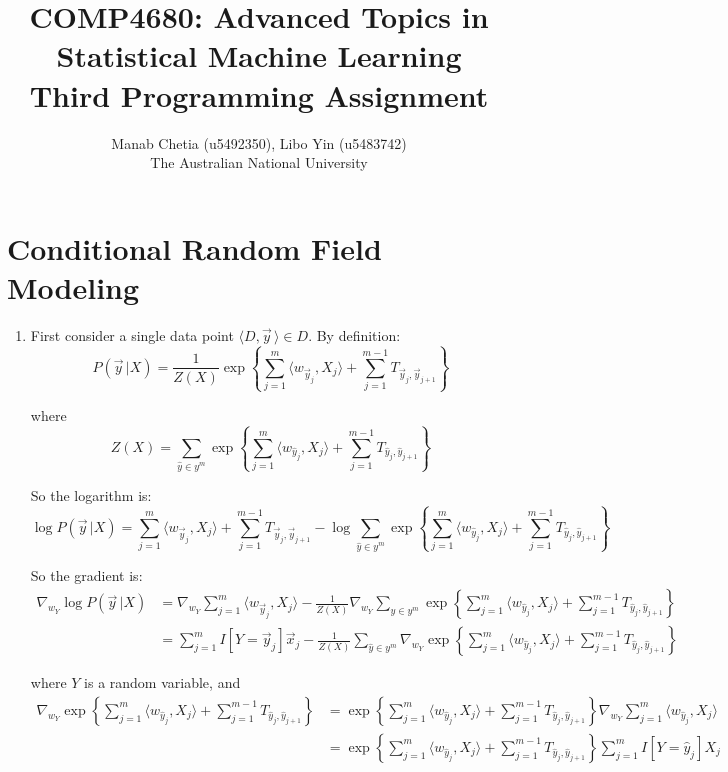\documentclass[11pt,a4paper]{article}
\begin{document}
\newcommand{\argmax}[1]{\operatorname*{arg\,max}_{#1}}

\title{COMP4680: Advanced Topics in Statistical Machine Learning\\Third Programming Assignment}
\author{Manab Chetia (u5492350), Libo Yin (u5483742)\\The Australian National University}
\maketitle

\section{Conditional Random Field Modeling}

\begin{enumerate}[label=(\alph*)]
\item
First consider a single data point $\langle D,\vec{y}\,\rangle\in D.$ By definition:
\[P(\vec{y}\,|X)=\frac{1}{Z(X)}\exp\left\{\sum_{j=1}^m\langle w_{\vec{y}_j},X_j\rangle+\sum_{j=1}^{m-1}T_{\vec{y}_j,\vec{y}_{j+1}}\right\}\]

where
\[Z(X)=\sum_{\hat{y}\in y^m}\exp\left\{\sum_{j=1}^m\langle w_{\hat{y}_j},X_j\rangle+\sum_{j=1}^{m-1}T_{\hat{y}_j,\hat{y}_{j+1}}\right\}\]

So the logarithm is:
\[\log P(\vec{y}\,|X)=\sum_{j=1}^m\langle w_{\vec{y}_j},X_j\rangle+\sum_{j=1}^{m-1}T_{\vec{y}_j,\vec{y}_{j+1}}-\log\sum_{\hat{y}\in y^m}\exp\left\{\sum_{j=1}^m\langle w_{\hat{y}_j},X_j\rangle+\sum_{j=1}^{m-1}T_{\hat{y}_j,\hat{y}_{j+1}}\right\}\]

So the gradient is:
\begin{align*}
\nabla_{w_Y}\log P(\vec{y}\,|X)&=\nabla_{w_Y}\sum_{j=1}^m\langle w_{\vec{y}_j},X_j\rangle-\frac{1}{Z(X)}\nabla_{w_Y}\sum_{\hat{y}\in y^m}\exp\left\{\sum_{j=1}^m\langle w_{\hat{y}_j},X_j\rangle+\sum_{j=1}^{m-1}T_{\hat{y}_j,\hat{y}_{j+1}}\right\}\\
&=\sum_{j=1}^m I[Y=\vec{y}_j]\vec{x}_j-\frac{1}{Z(X)}\sum_{\hat{y}\in y^m}\nabla_{w_Y}\exp\left\{\sum_{j=1}^m\langle w_{\hat{y}_j},X_j\rangle+\sum_{j=1}^{m-1}T_{\hat{y}_j,\hat{y}_{j+1}}\right\}
\end{align*}

where $Y$ is a random variable, and
\begin{align*}
\nabla_{w_Y}\exp\left\{\sum_{j=1}^m\langle w_{\hat{y}_j},X_j\rangle+\sum_{j=1}^{m-1}T_{\hat{y}_j,\hat{y}_{j+1}}\right\}&=\exp\left\{\sum_{j=1}^m\langle w_{\hat{y}_j},X_j\rangle+\sum_{j=1}^{m-1}T_{\hat{y}_j,\hat{y}_{j+1}}\right\}\nabla_{w_Y}\sum_{j=1}^m\langle w_{\hat{y}_j},X_j\rangle\\
&=\exp\left\{\sum_{j=1}^m\langle w_{\hat{y}_j},X_j\rangle+\sum_{j=1}^{m-1}T_{\hat{y}_j,\hat{y}_{j+1}}\right\}\sum_{j=1}^m I[Y=\hat{y}_j]X_j
\end{align*}


\end{enumerate}
\end{document}
